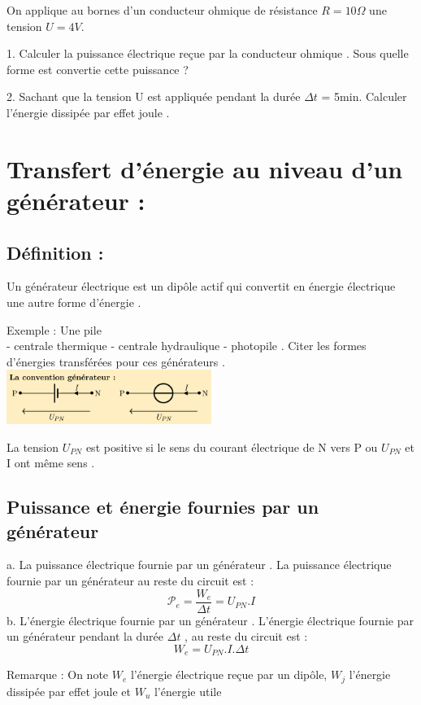 \documentclass[12pt]{article}
\begin{document}
\begin{tcolorbox}[colback=black!15!white,
                  colframe=black!10!black,
                  title=Application 2 :
                 ]
On applique au bornes d’un conducteur ohmique de résistance
$R = 10\Omega$ une tension $U = 4V$.

  1. Calculer la puissance électrique reçue par la conducteur
ohmique . Sous quelle forme est convertie cette puissance ?

  2. Sachant que la tension U est appliquée pendant la durée
  $\Delta{t}$ = 5min.
Calculer l’énergie dissipée par effet joule .
\end{tcolorbox}

\section{Transfert d’énergie au niveau d’un
générateur : }
\subsection{Définition : }
Un générateur électrique est un dipôle actif qui convertit en
énergie électrique une autre forme d’énergie . 

Exemple : Une pile
\\- centrale thermique - centrale hydraulique - photopile .
Citer les formes d’énergies transférées pour ces générateurs .
\includegraphics[width=0.5\textwidth]{./img/img_03.png}

La tension $U_{PN}$ est positive si le sens du courant électrique
de N vers P ou $U_{PN}$ et I ont même sens .

\subsection{Puissance et énergie fournies par un générateur}

a. La puissance électrique fournie par un générateur .
La puissance électrique fournie par un générateur au reste du
circuit est :
$$\mathscr{P}_e = \frac{W_e}{\Delta{t}} = U_{PN}.I$$
b. L’énergie électrique fournie par un générateur .
L’énergie électrique fournie par un générateur pendant la
durée $\Delta{t}$ , au reste du circuit est :
$$ 
W_e = U_{PN}.I.\Delta{t}
$$
\begin{tcolorbox}
Remarque : On note $W_e$ l’énergie électrique reçue par un dipôle,
$W_j$
l’énergie dissipée par effet joule et $W_u$ l’énergie utile
  \end{tcolorbox}
\end{document}

